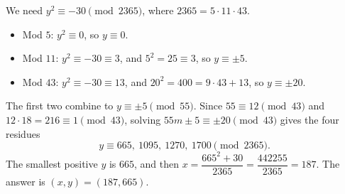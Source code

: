 We need $y^2\equiv-30\pmod{2365}$, where $2365=5\cdot11\cdot43$.
\begin{itemize}
\item Mod $5$: $y^2\equiv0$, so $y\equiv0$.
\item Mod $11$: $y^2\equiv-30\equiv3$, and $5^2=25\equiv3$, so $y\equiv\pm5$.
\item Mod $43$: $y^2\equiv-30\equiv13$, and $20^2=400=9\cdot43+13$, so $y\equiv\pm20$.
\end{itemize}
The first two combine to $y\equiv\pm5\pmod{55}$. Since $55\equiv12\pmod{43}$ and $12\cdot18=216\equiv1\pmod{43}$, solving $55m\pm5\equiv\pm20\pmod{43}$ gives the four residues
\[y\equiv665,\ 1095,\ 1270,\ 1700\pmod{2365}.\]
The smallest positive $y$ is $665$, and then $x=\dfrac{665^2+30}{2365}=\dfrac{442255}{2365}=187$. The answer is $\boxed{(x,y)=(187,665)}$.
